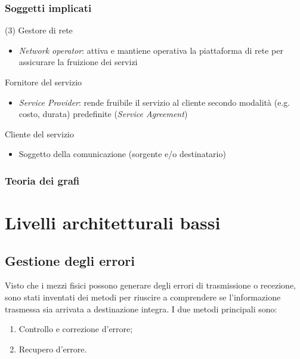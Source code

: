 \documentclass{book}
\begin{document}
\subsection{Soggetti implicati}
\begin{tasks}(3)
	\task Gestore di rete
	\begin{itemize}
		\item \textit{Network operator}: attiva e mantiene operativa la
			piattaforma di rete per assicurare la fruizione dei servizi
	\end{itemize}
	\task Fornitore del servizio
	\begin{itemize}
		\item \textit{Service Provider}: rende fruibile il servizio al cliente
			secondo modalità (e.g. costo, durata) predefinite (\textit{Service
			Agreement})
	\end{itemize}
	\task Cliente del servizio
	\begin{itemize}
		\item Soggetto della comunicazione (sorgente e/o destinatario)
	\end{itemize}
\end{tasks}
\subsection{Teoria dei grafi}


\chapter{Livelli architetturali bassi}

\section{Gestione degli errori}
Visto che i mezzi fisici possono generare degli errori di trasmissione o
recezione, sono stati inventati dei metodi per riuscire a comprendere se
l'informazione trasmessa sia arrivata a destinazione integra. I due metodi
principali sono:
\begin{enumerate}
	\item Controllo e correzione d'errore;
	\item Recupero d'errore.
\end{enumerate}
\end{document}
